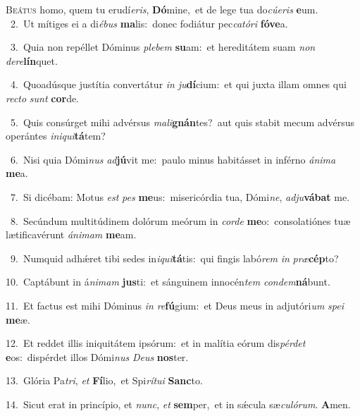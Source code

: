 \lettrine{\initial\textcolor{\initialcolor}{B}}{eátus} homo, quem tu erudí\-\textit{e}\-\textit{ris}, \textbf{Dó}\-mine,~\star et de lege tua do\-\textit{cú}\-\textit{e}\textit{ris} \textbf{e}\-um.\\
{\numbfont\textcolor{\numbcolor}{~2.}}~Ut mítiges ei a di\-\textit{é}\-\textit{bus} \textbf{ma}\-lis:~\star donec fodiátur pec\-\textit{ca}\-\textit{tó}\textit{ri} \textbf{fó}\-\textbf{ve}a.\par
{\numbfont\textcolor{\numbcolor}{~3.}}~Quia non repéllet Dóminus \textit{ple}\-\textit{bem} \textbf{su}\-am:~\star et hereditátem suam \textit{non} \textit{de}\-\textit{re}\textbf{lín}quet.\par
{\numbfont\textcolor{\numbcolor}{~4.}}~Quoadúsque justítia convertátur \textit{in} \textit{ju}\-\textbf{dí}cium:~\star et qui juxta illam omnes qui \textit{rec}\-\textit{to} \textit{sunt} \textbf{cor}\-de.\par
{\numbfont\textcolor{\numbcolor}{~5.}}~Quis consúrget mihi advérsus \textit{ma}\-\textit{li}\textbf{gnán}tes?~\star aut quis stabit mecum advérsus operántes \textit{in}\-\textit{i}\textit{qui}\textbf{tá}tem?\par
{\numbfont\textcolor{\numbcolor}{~6.}}~Nisi quia Dómi\textit{nus} \textit{ad}\-\textbf{jú}vit me:~\star paulo minus habitásset in inférno \textit{á}\-\textit{ni}\textit{ma} \textbf{me}\-a.\par
{\numbfont\textcolor{\numbcolor}{~7.}}~Si dicébam: Motus \textit{est} \textit{pes} \textbf{me}\-us:~\star misericórdia tua, Dómi\-\textit{ne}\-, \textit{ad}\-\textit{ju}\textbf{vá}\textbf{bat} me.\par
{\numbfont\textcolor{\numbcolor}{~8.}}~Secúndum multitúdinem dolórum meórum in \textit{cor}\-\textit{de} \textbf{me}\-o:~\star consolatiónes tuæ lætificavérunt \textit{á}\-\textit{ni}\textit{mam} \textbf{me}\-am.\par
{\numbfont\textcolor{\numbcolor}{~9.}}~Numquid adhǽret tibi sedes in\-\textit{i}\-\textit{qui}\textbf{tá}tis:~\star qui fingis labó\textit{rem} \textit{in} \textit{præ}\-\textbf{cép}to?\par
{\numbfont\textcolor{\numbcolor}{10.}}~Captábunt in á\-\textit{ni}\-\textit{mam} \textbf{jus}\-ti:~\star et sánguinem innocén\textit{tem} \textit{con}\-\textit{dem}\textbf{ná}bunt.\par
{\numbfont\textcolor{\numbcolor}{11.}}~Et factus est mihi Dóminus \textit{in} \textit{re}\-\textbf{fú}gium:~\star et Deus meus in adjutóri\textit{um} \textit{spe}\-\textit{i} \textbf{me}\-æ.\par
{\numbfont\textcolor{\numbcolor}{12.}}~Et reddet illis iniquitátem ipsórum:~\dagger et in malítia eórum dis\-\textit{pér}\-\textit{det} \textbf{e}\-os:~\star dispérdet illos Dómi\textit{nus} \textit{De}\-\textit{us} \textbf{nos}\-ter.\par
{\numbfont\textcolor{\numbcolor}{13.}}~Glória Pa\-\textit{tri}\-, \textit{et} \textbf{Fí}\-lio,~\star et Spi\-\textit{rí}\-\textit{tu}\textit{i} \textbf{Sanc}\-to.\par
{\numbfont\textcolor{\numbcolor}{14.}}~Sicut erat in princípio, et \textit{nunc}\-, \textit{et} \textbf{sem}\-per,~\star et in sǽcula sæ\-\textit{cu}\-\textit{ló}\textit{rum}. \textbf{A}\-men.\par
